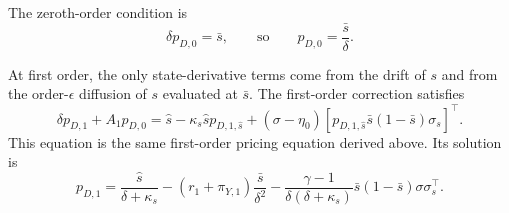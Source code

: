 The zeroth-order condition is
\begin{equation}
    \delta p_{D,0}=\bar{s},
    \qquad\text{so}\qquad
    p_{D,0}=\frac{\bar{s}}{\delta}.
\end{equation}

At first order, the only state-derivative terms come from the drift of $s$ and from the order-$\epsilon$ diffusion of $s$ evaluated at $\bar{s}$.
The first-order correction satisfies
\begin{equation}\label{eq:pD-first-order-PDE}
    \delta p_{D,1}+A_1p_{D,0}
    =\hat{s}-\kappa_s\hat{s}p_{D,1,\hat{s}}
    +(\sigma-\eta_0)\left[p_{D,1,\hat{s}}\bar{s}(1-\bar{s})\sigma_s\right]^\top.
\end{equation}
This equation is the same first-order pricing equation derived above.
Its solution is
\begin{equation}
    p_{D,1}
    = \frac{\hat{s}}{\delta+\kappa_s}
    -(r_1+\pi_{Y,1})\frac{\bar{s}}{\delta^2}
    -\frac{\gamma-1}{\delta(\delta+\kappa_s)}\bar{s}(1-\bar{s})\sigma\sigma_s^\top.
\end{equation}

